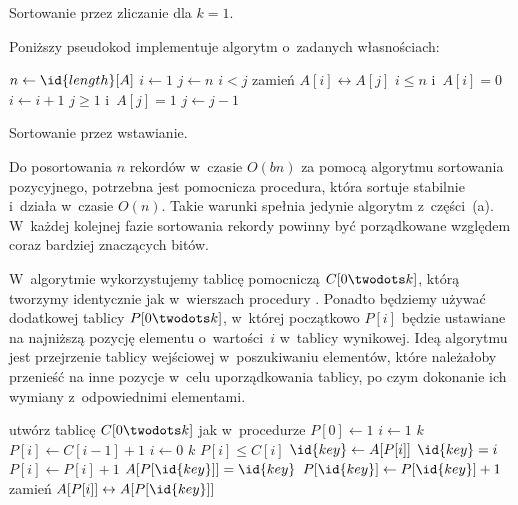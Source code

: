 
\subproblem %
Sortowanie przez zliczanie dla $k=1$.

\subproblem %
Poniższy pseudokod implementuje algorytm o~zadanych własnościach:
\begin{codebox}
\li	$n\gets\id{length}[A]$
\li	$i\gets1$
\li	$j\gets n$
\li	\While $i<j$
\li		\Do
			zamień $A[i]\leftrightarrow A[j]$
\li			\While $i\le n$ i~$A[i]=0$
\li				\Do $i\gets i+1$
				\End
\li			\While $j\ge1$ i~$A[j]=1$
\li				\Do $j\gets j-1$
				\End
		\End
\end{codebox}

\subproblem %
Sortowanie przez wstawianie.

\subproblem %
Do posortowania $n$ rekordów  w~czasie $O(bn)$ za pomocą algorytmu sortowania pozycyjnego, potrzebna jest pomocnicza procedura, która sortuje stabilnie i~działa w~czasie $O(n)$. Takie warunki spełnia jedynie algorytm z~części~(a). W~każdej kolejnej fazie sortowania rekordy powinny być porządkowane względem coraz bardziej znaczących bitów.

\subproblem %
W~algorytmie wykorzystujemy tablicę pomocniczą $C[0\twodots k]$, którą tworzymy identycznie jak w~wierszach  procedury . Ponadto będziemy używać dodatkowej tablicy $P[0\twodots k]$, w~której początkowo $P[i]$ będzie ustawiane na najniższą pozycję elementu o~wartości~$i$ w~tablicy wynikowej. Ideą algorytmu jest przejrzenie tablicy wejściowej w~poszukiwaniu elementów, które należałoby przenieść na inne pozycje w~celu uporządkowania tablicy, po czym dokonanie ich wymiany z~odpowiednimi elementami.
\begin{codebox}
\li	utwórz tablicę $C[0\twodots k]$ jak w~procedurze  
\li	$P[0]\gets1$ \label{li:in-place-counting-sort-preprocessing-begin}
\li	\For $i\gets1$ \To $k$
\li		\Do $P[i]\gets C[i-1]+1$
		\End \label{li:in-place-counting-sort-preprocessing-end}
\li	\For $i\gets0$ \To $k$ \label{li:in-place-counting-sort-for-begin}
\li		\Do
			\While $P[i]\le C[i]$ \label{li:in-place-counting-sort-while-begin}
\li				\Do
					$\id{key}\gets A[P[i]]$
\li					\If $\id{key}=i$
\li						\Then $P[i]\gets P[i]+1$ \label{li:in-place-counting-sort-increment}
\li						\Else
							\While $A[P[\id{key}]]=\id{key}$
\li								\Do $P[\id{key}]\gets P[\id{key}]+1$
								\End
\li							zamień $A[P[i]]\leftrightarrow A[P[\id{key}]]$ \label{li:in-place-counting-sort-swap}
						\End
				\End \label{li:in-place-counting-sort-while-end}
		\End \label{li:in-place-counting-sort-for-end}
\end{codebox}


